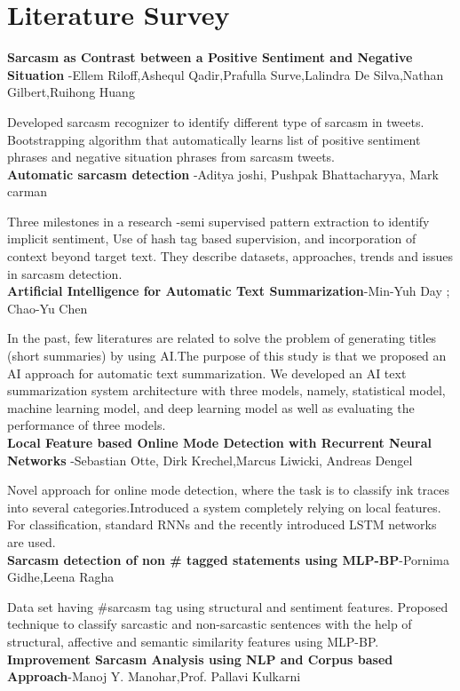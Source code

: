 \documentclass[oneside,a4paper,12pt]{book}
\begin{document}
\chapter{Literature Survey}
\textbf{Sarcasm as Contrast between a Positive Sentiment and Negative Situation} -Ellem Riloff,Ashequl Qadir,Prafulla Surve,Lalindra De Silva,Nathan Gilbert,Ruihong Huang 
\par Developed sarcasm recognizer to identify different type of sarcasm in tweets. Bootstrapping algorithm that automatically learns list of positive sentiment phrases and negative situation phrases from sarcasm tweets. \\
\textbf{Automatic sarcasm detection} -Aditya joshi, Pushpak Bhattacharyya, Mark carman 
\par Three milestones in a research -semi supervised pattern extraction to identify implicit sentiment, Use of hash tag based supervision, and incorporation  of context beyond target text. They describe datasets, approaches, trends and issues in sarcasm detection. \\
\textbf{Artificial Intelligence for Automatic Text Summarization}-Min-Yuh Day ; Chao-Yu Chen
\par In the past, few literatures are related to solve the problem of generating titles (short summaries) by using AI.The purpose of this study is that we proposed an AI approach for automatic text summarization. We developed an AI text summarization system architecture with three  models, namely, statistical model, machine learning model, and deep learning model as well as evaluating the performance of three models. \\
\textbf{Local Feature based Online Mode Detection with Recurrent Neural Networks} -Sebastian Otte, Dirk Krechel,Marcus Liwicki, Andreas Dengel
\par Novel approach for online mode detection, where the task is to classify ink traces into several categories.Introduced a system completely relying on local features. For classification, standard RNNs and the recently introduced LSTM networks are used. \\
\textbf{Sarcasm detection of non # tagged statements using MLP-BP}-Pornima Gidhe,Leena Ragha
\par Data set having #sarcasm tag using structural and sentiment features. Proposed technique to classify sarcastic and non-sarcastic sentences with the help of structural, affective and semantic similarity features using MLP-BP. \\
\textbf{Improvement Sarcasm Analysis using NLP and Corpus based Approach}-Manoj Y. Manohar,Prof. Pallavi Kulkarni
\end{document}
